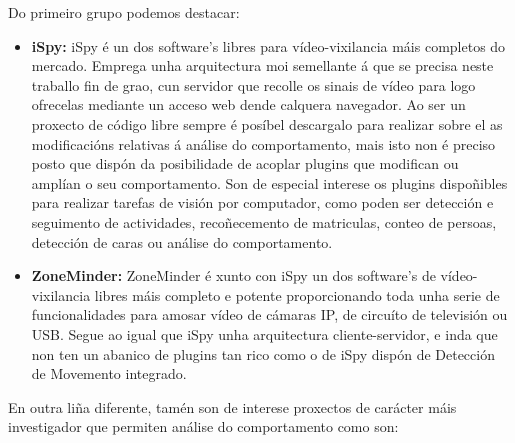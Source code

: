        Do primeiro grupo podemos destacar:
        \begin{itemize}
         \item \textbf{iSpy:}\cite{iSpy-webpage}
            iSpy é un dos software's libres para vídeo-vixilancia máis completos do mercado. Emprega
            unha arquitectura moi semellante á que se precisa neste traballo fin de grao, cun 
            servidor que recolle os sinais de vídeo para logo ofrecelas mediante un acceso web 
            dende calquera navegador. 
            Ao ser un proxecto de código libre sempre é posíbel descargalo para realizar sobre el as
            modificacións relativas á análise do comportamento, mais isto non é preciso posto que 
            dispón da posibilidade de acoplar plugins que modifican ou amplían o seu comportamento.
            Son de especial interese os plugins dispoñibles para realizar tarefas de visión por
            computador\cite{iSpy-plugins}, como poden ser detección e seguimento de actividades,
            recoñecemento de matriculas, conteo de persoas, detección de caras ou análise do 
            comportamento.
         \item \textbf{ZoneMinder:} \cite{zoneMinder-webPage}
            ZoneMinder é xunto con iSpy un dos software's de vídeo-vixilancia libres máis completo
            e potente proporcionando toda unha serie de funcionalidades para amosar vídeo de cámaras
            IP, de circuíto de televisión ou USB. Segue ao igual que iSpy unha arquitectura 
            cliente-servidor, e inda que non ten un abanico de plugins tan rico como o de iSpy 
            dispón de Detección de Movemento integrado\cite{zoneMinder-motion-detection}.
        \end{itemize}
        
        En outra liña diferente, tamén son de interese proxectos de carácter máis investigador que 
        permiten análise do comportamento como son:
        
